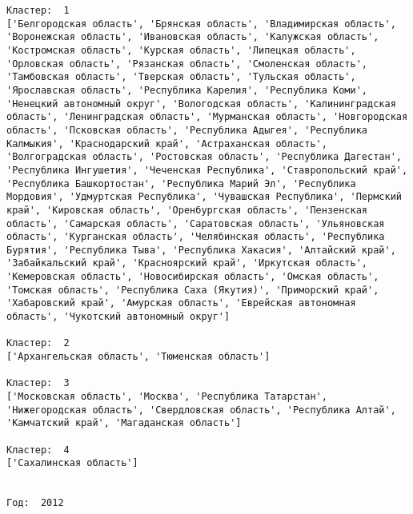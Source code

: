 \documentclass[11pt]{article}
\begin{document}
\begin{Verbatim}[commandchars=\\\{\}]
Кластер:  1
['Белгородская область', 'Брянская область', 'Владимирская область', 'Воронежская область', 'Ивановская область', 'Калужская область', 'Костромская область', 'Курская область', 'Липецкая область', 'Орловская область', 'Рязанская область', 'Смоленская область', 'Тамбовская область', 'Тверская область', 'Тульская область', 'Ярославская область', 'Республика Карелия', 'Республика Коми', 'Ненецкий автономный округ', 'Вологодская область', 'Калинингpадская область', 'Ленинградская область', 'Мурманская область', 'Новгородская область', 'Псковская область', 'Республика Адыгея', 'Республика Калмыкия', 'Краснодарский край', 'Астраханская область', 'Волгоградская область', 'Ростовская область', 'Республика Дагестан', 'Республика Ингушетия', 'Чеченская Республика', 'Ставропольский край', 'Республика Башкортостан', 'Республика Марий Эл', 'Республика Мордовия', 'Удмуртская Республика', 'Чувашская Республика', 'Пермский край', 'Кировская область', 'Оренбургская область', 'Пензенская область', 'Самарская область', 'Саратовская область', 'Ульяновская область', 'Курганская область', 'Челябинская область', 'Республика Бурятия', 'Республика Тыва', 'Республика Хакасия', 'Алтайский край', 'Забайкальский край', 'Красноярский край', 'Иркутская область', 'Кемеровская область', 'Новосибирская область', 'Омская область', 'Томская область', 'Республика Саха (Якутия)', 'Приморский край', 'Хабаровский край', 'Амурская область', 'Еврейская автономная область', 'Чукотский автономный округ']

Кластер:  2
['Архангельская область', 'Тюменская область']

Кластер:  3
['Московская область', 'Москва', 'Республика Татарстан', 'Нижегородская область', 'Свердловская область', 'Республика Алтай', 'Камчатский край', 'Магаданская область']

Кластер:  4
['Сахалинская область']


Год:  2012


\end{Verbatim}
\end{document}
